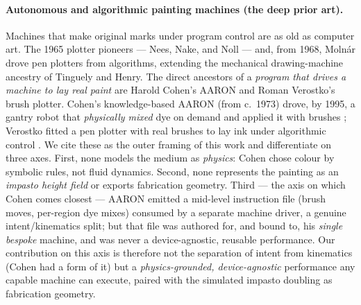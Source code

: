 \documentclass[11pt]{article}
\begin{document}
\paragraph{Autonomous and algorithmic painting machines (the deep prior art).}
Machines that make original marks under program control are as old as computer
art. The 1965 plotter pioneers --- Nees, Nake, and Noll
\citep{noll2016howardwise,taylor2014machine} --- and, from 1968, Molnár drove pen
plotters from algorithms, extending the mechanical drawing-machine ancestry of
Tinguely and Henry. The direct ancestors of a \emph{program that drives a machine
to lay real paint} are Harold Cohen's AARON and Roman Verostko's brush plotter.
Cohen's knowledge-based AARON (from c.~1973) drove, by 1995, a gantry robot that
\emph{physically mixed} dye on demand and applied it with brushes
\citep{mccorduck1991aaron,cohen1995furtherexploits}; Verostko fitted a pen plotter
with real brushes to lay ink under algorithmic control
\citep{verostko1990epigenetic}. We cite these as the outer framing of this work
and differentiate on three axes. First, none models the medium as \emph{physics}:
Cohen chose colour by symbolic rules, not fluid dynamics. Second, none represents
the painting as an \emph{impasto height field} or exports fabrication geometry.
Third --- the axis on which Cohen comes closest --- AARON emitted a mid-level
instruction file (brush moves, per-region dye mixes) consumed by a separate
machine driver, a genuine intent/kinematics split; but that file was authored for,
and bound to, his \emph{single bespoke} machine, and was never a device-agnostic,
reusable performance. Our contribution on this axis is therefore not the
separation of intent from kinematics (Cohen had a form of it) but a
\emph{physics-grounded, device-agnostic} performance any capable machine can
execute, paired with the simulated impasto doubling as fabrication geometry.
\end{document}
